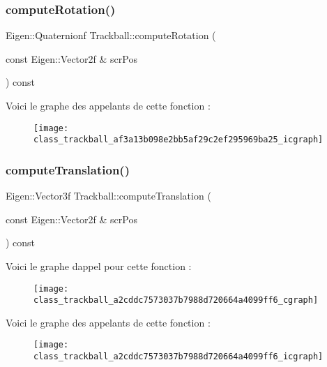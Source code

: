 \subsubsection{\texorpdfstring{compute\+Rotation()}{computeRotation()}}
{\footnotesize\ttfamily Eigen\+::\+Quaternionf Trackball\+::compute\+Rotation (\begin{DoxyParamCaption}\item[{const Eigen\+::\+Vector2f \&}]{scr\+Pos }\end{DoxyParamCaption}) const\hspace{0.3cm}{\ttfamily [private]}}

Voici le graphe des appelants de cette fonction \+:\nopagebreak
\begin{figure}[H]
\begin{center}
\leavevmode
\texttt{[image: class\_trackball\_af3a13b098e2bb5af29c2ef295969ba25\_icgraph]}
\end{center}
\end{figure}
\mbox{\label{class_trackball_a2cddc7573037b7988d720664a4099ff6}} 
\subsubsection{\texorpdfstring{compute\+Translation()}{computeTranslation()}}
{\footnotesize\ttfamily Eigen\+::\+Vector3f Trackball\+::compute\+Translation (\begin{DoxyParamCaption}\item[{const Eigen\+::\+Vector2f \&}]{scr\+Pos }\end{DoxyParamCaption}) const\hspace{0.3cm}{\ttfamily [private]}}

Voici le graphe d\textquotesingle{}appel pour cette fonction \+:\nopagebreak
\begin{figure}[H]
\begin{center}
\leavevmode
\texttt{[image: class\_trackball\_a2cddc7573037b7988d720664a4099ff6\_cgraph]}
\end{center}
\end{figure}
Voici le graphe des appelants de cette fonction \+:\nopagebreak
\begin{figure}[H]
\begin{center}
\leavevmode
\texttt{[image: class\_trackball\_a2cddc7573037b7988d720664a4099ff6\_icgraph]}
\end{center}
\end{figure}
\mbox{\label{class_trackball_acb8ad68c2077f4ff149e501acfe67d50}} 
